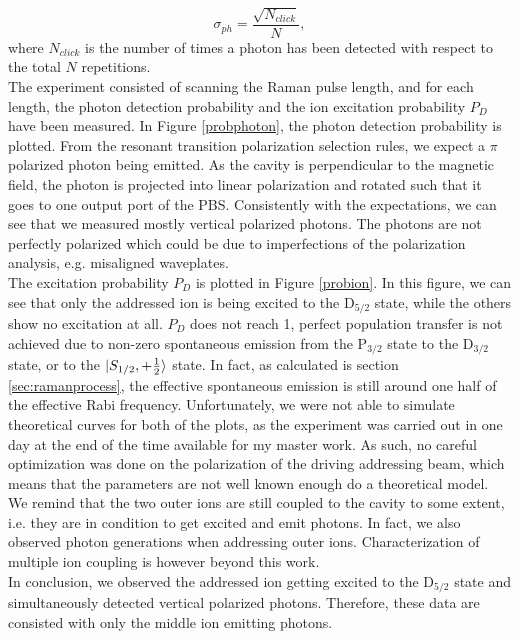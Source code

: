\begin{equation}
\sigma_{ph} = \frac{\sqrt{N_{click}}}{N},
\end{equation}
where $N_{click}$ is the number of times a photon has been detected with respect to the total $N$ repetitions. \\
The experiment consisted of scanning the Raman pulse length, and for each length, the photon detection probability and the ion excitation probability $P_D$ have been measured. In Figure \ref{probphoton}, the photon detection probability is plotted. From the resonant transition polarization selection rules, we expect a $\pi$ polarized photon being emitted. As the cavity is perpendicular to the magnetic field, the photon is projected into linear polarization and rotated such that it goes to one output port of the PBS. Consistently with the expectations, we can see that we measured mostly vertical polarized photons. The photons are not perfectly polarized which could be due to imperfections of the polarization analysis, e.g. misaligned waveplates.\\
The excitation probability $P_D$ is plotted in Figure \ref{probion}. In this figure, we can see that only the addressed ion is being excited to the $\text{D}_{5/2}$ state, while the others show no excitation at all. $P_D$ does not reach 1, perfect population transfer is not achieved due to non-zero spontaneous emission from the $\text{P}_{3/2}$ state to the $\text{D}_{3/2}$ state, or to the $\ket{S_{1/2},+\frac{1}{2}}$ state. In fact, as calculated is section \ref{sec:ramanprocess}, the effective spontaneous emission is still around one half of the effective Rabi frequency. Unfortunately, we were not able to simulate theoretical curves for both of the plots, as the experiment was carried out in one day at the end of the time available for my master work. As such, no careful optimization was done on the polarization of the driving addressing beam, which means that the parameters are not well known enough do a theoretical model. We remind that the two outer ions are still coupled to the cavity to some extent, i.e. they are in condition to get excited and emit photons. In fact, we also observed photon generations when addressing outer ions. Characterization of multiple ion coupling is however beyond this work. \\
In conclusion, we observed the addressed ion getting excited to the $\text{D}_{5/2}$ state and simultaneously detected vertical polarized photons. Therefore, these data are consisted with only the middle ion emitting photons.

